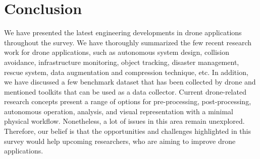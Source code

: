 \section{Conclusion}
\label{conclusionsection}
We have presented the latest engineering developments in drone applications throughout the survey. We have thoroughly summarized the few recent research work for drone applications, such as autonomous system design, collision avoidance, infrastructure monitoring, object tracking, disaster management, rescue system, data augmentation and compression technique, etc. In addition, we have discussed a few benchmark dataset that has been collected by drone and mentioned toolkits that can be used as a data collector. Current drone-related research concepts present a range of options for pre-processing, post-processing, autonomous operation, analysis, and visual representation with a minimal physical workflow. Nonetheless, a lot of issues in this area remain unexplored. Therefore, our belief is that the opportunities and challenges highlighted in this survey would help upcoming researchers, who are aiming to improve drone applications.